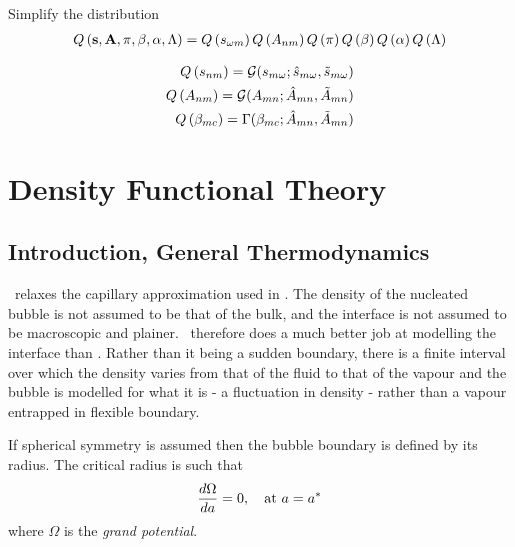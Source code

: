 {Simplify the distribution
\begin{align}
Q\left( \mathbf{s}, \textbf{A}, \pi, \beta, \alpha, \Lambda \right) = Q\left( s_{\omega m} \right)Q\left( A_{nm} \right)Q\left( \pi \right)Q\left( \beta \right)Q\left( \alpha \right)Q\left( \Lambda \right)
\end{align}

\begin{align}
  Q\left( s_{nm} \right) = {\cal{G}}(s_{m \omega};\hat{s}_{m\omega}, \tilde{s}_{m\omega})\\
  Q\left( A_{nm} \right) = {\cal{G}}(A_{mn};\hat{A}_{mn}, \tilde{A}_{mn})\\
  Q\left( \beta_{mc} \right) = \Gamma(\beta_{mc};\hat{A}_{mn}, \tilde{A}_{mn})
\end{align}




\section{Density Functional Theory}\label{app:DFT}


\subsection{Introduction, General Thermodynamics}

\Dft\ relaxes the capillary approximation used in \cnt.
The density of the nucleated bubble is not assumed to be that of the bulk,
and the interface is not assumed to be macroscopic and plainer\cite{Oxtoby1992, Oxtoby1998}.
\Dft\ therefore does a much better job at modelling the interface than \cnt.
Rather than it being a sudden boundary,
there is a finite interval over which the density varies from that of the fluid to that of the vapour
and the bubble is modelled for what it is -  a fluctuation in density - 
rather than a vapour entrapped in  flexible boundary.

If  spherical symmetry is assumed then 
the bubble boundary is defined by its radius.
The critical radius is such that\cite{Oxtoby1992,Oxtoby1998}
\begin{align}
  \frac{d \Omega}{d a} =0,\quad\text{at $a = {a^\ast}$} \label{eqn:DFT:astarR}
\end{align}
where $\Omega$ is the {\em grand potential}.


}
